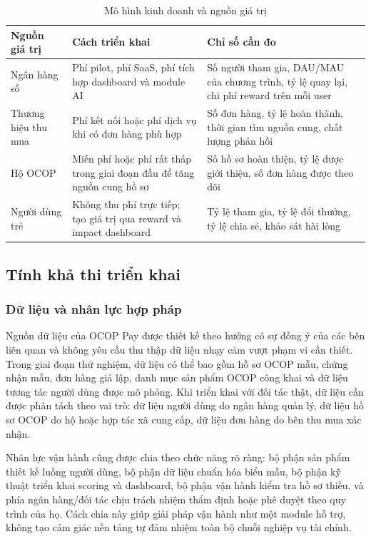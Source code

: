 \documentclass[13pt,a4paper]{extarticle}
\begin{document}
\begin{table}[H]
\centering
\caption{Mô hình kinh doanh và nguồn giá trị}
\begin{tabular}{|p{3.5cm}|p{5cm}|p{5cm}|}
\hline
\textbf{Nguồn giá trị} & \textbf{Cách triển khai} & \textbf{Chỉ số cần đo} \\
\hline
Ngân hàng số & Phí pilot, phí SaaS, phí tích hợp dashboard và module AI & Số người tham gia, DAU/MAU của chương trình, tỷ lệ quay lại, chi phí reward trên mỗi user \\
\hline
Thương hiệu thu mua & Phí kết nối hoặc phí dịch vụ khi có đơn hàng phù hợp & Số đơn hàng, tỷ lệ hoàn thành, thời gian tìm nguồn cung, chất lượng phản hồi \\
\hline
Hộ OCOP & Miễn phí hoặc phí rất thấp trong giai đoạn đầu để tăng nguồn cung hồ sơ & Số hồ sơ hoàn thiện, tỷ lệ được giới thiệu, số đơn hàng được theo dõi \\
\hline
Người dùng trẻ & Không thu phí trực tiếp; tạo giá trị qua reward và impact dashboard & Tỷ lệ tham gia, tỷ lệ đổi thưởng, tỷ lệ chia sẻ, khảo sát hài lòng \\
\hline
\end{tabular}
\end{table}

\subsection{Tính khả thi triển khai}

\subsubsection{Dữ liệu và nhân lực hợp pháp}

Nguồn dữ liệu của OCOP Pay được thiết kế theo hướng có sự đồng ý của các bên liên quan và không yêu cầu thu thập dữ liệu nhạy cảm vượt phạm vi cần thiết. Trong giai đoạn thử nghiệm, dữ liệu có thể bao gồm hồ sơ OCOP mẫu, chứng nhận mẫu, đơn hàng giả lập, danh mục sản phẩm OCOP công khai và dữ liệu tương tác người dùng được mô phỏng. Khi triển khai với đối tác thật, dữ liệu cần được phân tách theo vai trò: dữ liệu người dùng do ngân hàng quản lý, dữ liệu hồ sơ OCOP do hộ hoặc hợp tác xã cung cấp, dữ liệu đơn hàng do bên thu mua xác nhận.

Nhân lực vận hành cũng được chia theo chức năng rõ ràng: bộ phận sản phẩm thiết kế luồng người dùng, bộ phận dữ liệu chuẩn hóa biểu mẫu, bộ phận kỹ thuật triển khai scoring và dashboard, bộ phận vận hành kiểm tra hồ sơ thiếu, và phía ngân hàng/đối tác chịu trách nhiệm thẩm định hoặc phê duyệt theo quy trình của họ. Cách chia này giúp giải pháp vận hành như một module hỗ trợ, không tạo cảm giác nền tảng tự đảm nhiệm toàn bộ chuỗi nghiệp vụ tài chính.
\end{document}
